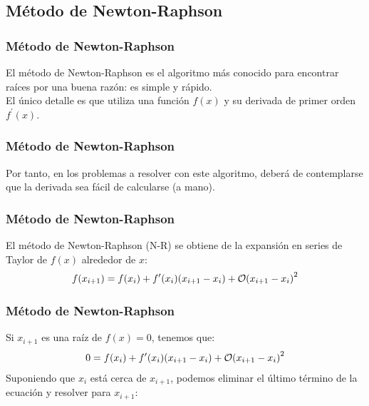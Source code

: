 	
\subsection{Método de Newton-Raphson}
\begin{frame}
\frametitle{Método de Newton-Raphson}
El método de Newton-Raphson es el algoritmo más conocido para encontrar raíces por una buena razón: es simple y rápido.
\\
\medskip
El único detalle es que utiliza una función $f(x)$ y su derivada de primer orden $f^{\prime}(x)$.
\end{frame}
\begin{frame}
\frametitle{Método de Newton-Raphson}
Por tanto, en los problemas a resolver con este algoritmo, deberá de contemplarse que la derivada sea fácil de calcularse (a mano).
\end{frame}
\begin{frame}
\frametitle{Método de Newton-Raphson}
El método de Newton-Raphson (N-R) se obtiene de la expansión en series de Taylor de $f(x)$ alrededor de $x$:
\begin{align*}
f(x_{i + 1})  = f(x_{i}) + f^{\prime}(x_{i})(x_{i + 1} - x_{i}) + \order{x_{i + 1} - x_{i}}^{2}
\end{align*}
\end{frame}
\begin{frame}
\frametitle{Método de Newton-Raphson}
Si $x_{i + 1}$ es una raíz de $f(x) = 0$, tenemos que:
\begin{align*}
0 = f(x_{i}) + f^{\prime}(x_{i})(x_{i + 1} - x_{i}) + \order{x_{i + 1} - x_{i}}^{2}
\end{align*}
Suponiendo que $x_{i}$ está cerca de $x_{i + 1}$, podemos eliminar el último término de la ecuación y resolver para $x_{i+1}$:
\end{frame}
